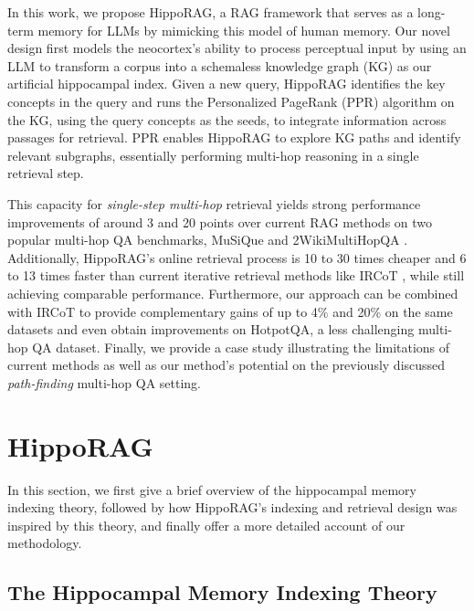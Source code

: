 \documentclass{article}
\begin{document}
In this work, we propose HippoRAG, a RAG framework that serves as a long-term memory for LLMs by mimicking this model of human memory.
Our novel design first models the neocortex's ability to process perceptual input by using an LLM to transform a corpus into a schemaless knowledge graph (KG) as our artificial hippocampal index.
Given a new query, HippoRAG identifies the key concepts in the query and runs the Personalized PageRank (PPR) algorithm \cite{david02topic} on the KG, using the query concepts as the seeds, to integrate information across passages for retrieval. 
PPR enables HippoRAG to explore KG paths and identify relevant subgraphs, essentially performing multi-hop reasoning in a single retrieval step.

This capacity for \textit{single-step multi-hop} retrieval yields strong performance improvements of around \num{3} and \num{20} points over current RAG methods \cite{densex,contriever,gtr,colbertv2,raptor} on two popular multi-hop QA benchmarks, MuSiQue \cite{musique} and 2WikiMultiHopQA \cite{2wiki}. 
Additionally, HippoRAG's online retrieval process is \num{10} to \num{30} times cheaper and \num{6} to \num{13} times faster than current iterative retrieval methods like IRCoT \cite{ircot}, while still achieving comparable performance.
Furthermore, our approach can be combined with IRCoT to provide complementary gains of up to \num{4}\% and \num{20}\% on the same datasets and even obtain improvements on HotpotQA, a less challenging multi-hop QA dataset.
Finally, we provide a case study illustrating the limitations of current methods as well as our method's potential on the previously discussed \textit{path-finding} multi-hop QA setting.

\section{HippoRAG}
\label{sec:long-term}

In this section, we first give a brief overview of the hippocampal memory indexing theory, followed by how HippoRAG's indexing and retrieval design was inspired by this theory, and finally offer a more detailed account of our methodology.

\subsection{The Hippocampal Memory Indexing Theory}
\label{subsec:indexing_theory}
\end{document}
